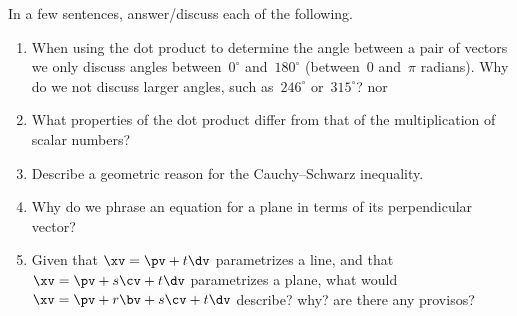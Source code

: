 \begin{exercise}  
In a few sentences, answer\slash discuss each of the following.
\begin{enumerate}
\item When using the dot product to determine the angle between a pair of vectors we only discuss angles between~\(0^\circ\) and~\(180^\circ\) (between~\(0\) and~\(\pi\) radians).  Why do we not discuss larger angles, such as~\(246^\circ\) or~\(315^\circ\)? nor 

\item What properties of the dot product differ from that of the multiplication of scalar numbers?

\item Describe a geometric reason for the Cauchy--Schwarz inequality.

\item Why do we phrase an equation for a plane in terms of its perpendicular vector?

\item Given that \(\xv=\pv+t\dv\) parametrizes a line, and that \(\xv=\pv+s\cv+t\dv\) parametrizes a plane, what would \(\xv=\pv+r\bv+s\cv+t\dv\) describe? why? are there any provisos?

\end{enumerate}
\end{exercise}

\begin{comment}%
why, what caused X?
how did X occur?
what-if? what-if-not?
how does X compare with Y?
what is the evidence for X?
why is X important?
\end{comment}

